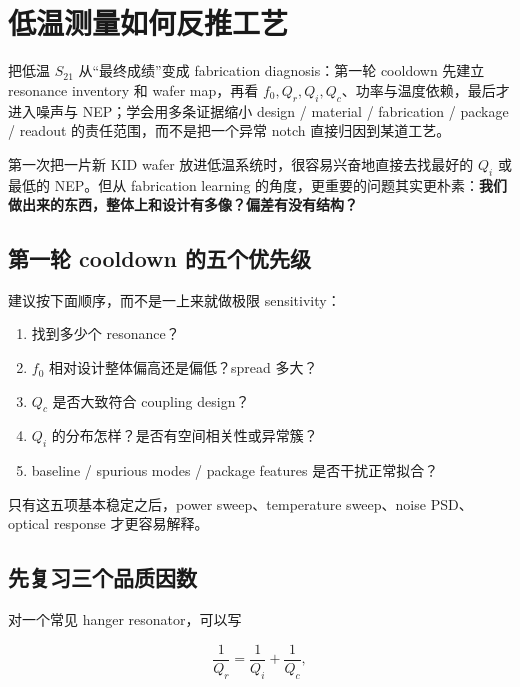 \chapter{低温测量如何反推工艺}

\begin{chaptergoal}
把低温 $S_{21}$ 从“最终成绩”变成 fabrication diagnosis：第一轮 cooldown 先建立 resonance inventory 和 wafer map，再看 $f_0,Q_r,Q_i,Q_c$、功率与温度依赖，最后才进入噪声与 NEP；学会用多条证据缩小 design / material / fabrication / package / readout 的责任范围，而不是把一个异常 notch 直接归因到某道工艺。
\end{chaptergoal}

第一次把一片新 KID wafer 放进低温系统时，很容易兴奋地直接去找最好的 $Q_i$ 或最低的 NEP。但从 fabrication learning 的角度，更重要的问题其实更朴素：\textbf{我们做出来的东西，整体上和设计有多像？偏差有没有结构？}


\section{第一轮 cooldown 的五个优先级}

建议按下面顺序，而不是一上来就做极限 sensitivity：

\begin{enumerate}
  \item 找到多少个 resonance？
  \item $f_0$ 相对设计整体偏高还是偏低？spread 多大？
  \item $Q_c$ 是否大致符合 coupling design？
  \item $Q_i$ 的分布怎样？是否有空间相关性或异常簇？
  \item baseline / spurious modes / package features 是否干扰正常拟合？
\end{enumerate}

只有这五项基本稳定之后，power sweep、temperature sweep、noise PSD、optical response 才更容易解释。

\section{先复习三个品质因数}

对一个常见 hanger resonator，可以写

\[
\frac{1}{Q_r}=\frac{1}{Q_i}+\frac{1}{Q_c},
\]

